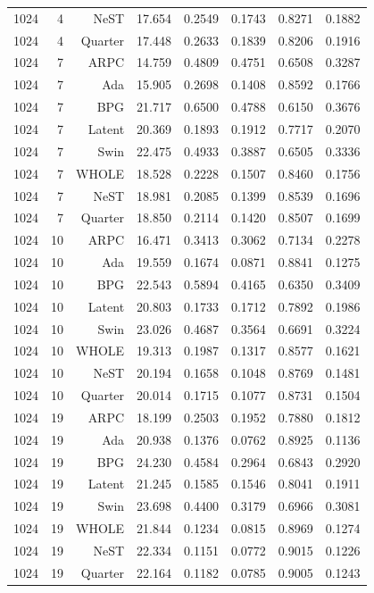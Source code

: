 \documentclass[10pt,letterpaper]{article}
\begin{document}
\begin{longtable}{@{}lrrrrrrr@{}}
1024 & 4 & NeST & 17.654 & 0.2549 & 0.1743 & 0.8271 & 0.1882\\
1024 & 4 & Quarter & 17.448 & 0.2633 & 0.1839 & 0.8206 & 0.1916\\
1024 & 7 & ARPC & 14.759 & 0.4809 & 0.4751 & 0.6508 & 0.3287\\
1024 & 7 & Ada & 15.905 & 0.2698 & 0.1408 & 0.8592 & 0.1766\\
1024 & 7 & BPG & 21.717 & 0.6500 & 0.4788 & 0.6150 & 0.3676\\
1024 & 7 & Latent & 20.369 & 0.1893 & 0.1912 & 0.7717 & 0.2070\\
1024 & 7 & Swin & 22.475 & 0.4933 & 0.3887 & 0.6505 & 0.3336\\
1024 & 7 & WHOLE & 18.528 & 0.2228 & 0.1507 & 0.8460 & 0.1756\\
1024 & 7 & NeST & 18.981 & 0.2085 & 0.1399 & 0.8539 & 0.1696\\
1024 & 7 & Quarter & 18.850 & 0.2114 & 0.1420 & 0.8507 & 0.1699\\
1024 & 10 & ARPC & 16.471 & 0.3413 & 0.3062 & 0.7134 & 0.2278\\
1024 & 10 & Ada & 19.559 & 0.1674 & 0.0871 & 0.8841 & 0.1275\\
1024 & 10 & BPG & 22.543 & 0.5894 & 0.4165 & 0.6350 & 0.3409\\
1024 & 10 & Latent & 20.803 & 0.1733 & 0.1712 & 0.7892 & 0.1986\\
1024 & 10 & Swin & 23.026 & 0.4687 & 0.3564 & 0.6691 & 0.3224\\
1024 & 10 & WHOLE & 19.313 & 0.1987 & 0.1317 & 0.8577 & 0.1621\\
1024 & 10 & NeST & 20.194 & 0.1658 & 0.1048 & 0.8769 & 0.1481\\
1024 & 10 & Quarter & 20.014 & 0.1715 & 0.1077 & 0.8731 & 0.1504\\
1024 & 19 & ARPC & 18.199 & 0.2503 & 0.1952 & 0.7880 & 0.1812\\
1024 & 19 & Ada & 20.938 & 0.1376 & 0.0762 & 0.8925 & 0.1136\\
1024 & 19 & BPG & 24.230 & 0.4584 & 0.2964 & 0.6843 & 0.2920\\
1024 & 19 & Latent & 21.245 & 0.1585 & 0.1546 & 0.8041 & 0.1911\\
1024 & 19 & Swin & 23.698 & 0.4400 & 0.3179 & 0.6966 & 0.3081\\
1024 & 19 & WHOLE & 21.844 & 0.1234 & 0.0815 & 0.8969 & 0.1274\\
1024 & 19 & NeST & 22.334 & 0.1151 & 0.0772 & 0.9015 & 0.1226\\
1024 & 19 & Quarter & 22.164 & 0.1182 & 0.0785 & 0.9005 & 0.1243\\
\bottomrule\end{longtable}
\end{document}
